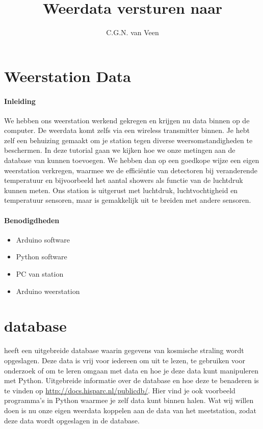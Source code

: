 

\title{Weerdata versturen naar \hisparc}
\author{C.G.N. van Veen}



\maketitle

\section{Weerstation Data}

\paragraph{Inleiding} We hebben ons weerstation werkend gekregen en krijgen nu
data binnen op de computer. De weerdata komt zelfs via een wireless
transmitter binnen. Je hebt zelf een behuizing gemaakt om je station
tegen diverse weersomstandigheden te beschermen. In deze tutorial gaan we kijken
hoe we onze metingen aan de database van \hisparc kunnen toevoegen.
We hebben dan op een goedkope wijze een eigen weerstation verkregen, waarmee
we de efficiëntie van detectoren bij veranderende temperatuur en bijvoorbeeld
het aantal showers als functie van de luchtdruk kunnen meten. Ons station is uitgerust
met luchtdruk, luchtvochtigheid en temperatuur sensoren, maar is gemakkelijk uit
te breiden met andere sensoren.

\paragraph{Benodigdheden}

\begin{itemize}
    \item Arduino software
    \item Python software
    \item PC van \hisparc station
    \item Arduino weerstation
\end{itemize}

\section{\hisparc database}

\hisparc heeft een uitgebreide database waarin gegevens van kosmische straling
wordt opgeslagen. Deze data is vrij voor iedereen om uit te lezen, te gebruiken
voor onderzoek of om te leren omgaan met data en hoe je deze data kunt manipuleren met Python.
Uitgebreide informatie over de \hisparc database en hoe deze te benaderen is te
vinden op \url{http://docs.hisparc.nl/publicdb/}. Hier vind je ook voorbeeld
programma's in Python waarmee je zelf data kunt binnen halen.
Wat wij willen doen is nu onze eigen weerdata koppelen aan de data van het \hisparc
meetstation, zodat deze data wordt opgeslagen in de \hisparc database.


